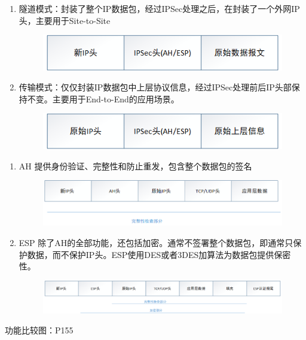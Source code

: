 \begin{enumerate}
	\item 隧道模式：封装了整个IP数据包，经过IPSec处理之后，在封装了一个外网IP头，主要用于Site-to-Site
	\begin{figure}[H]
		\centering
		\includegraphics[width=0.7\linewidth]{figures/screenshot002}
		\caption{}
		\label{fig:screenshot002}
	\end{figure}
	
	\item 传输模式：仅仅封装IP数据包中上层协议信息，经过IPSec处理前后IP头部保持不变。主要用于End-to-End的应用场景。
	\begin{figure}
		\centering
		\includegraphics[width=0.7\linewidth]{figures/screenshot003}
		\caption{}
		\label{fig:screenshot003}
	\end{figure}
	
\end{enumerate}


\begin{enumerate}
	\item AH 提供身份验证、完整性和防止重发，包含整个数据包的签名
	\begin{figure}[H]
		\centering
		\includegraphics[width=0.7\linewidth]{figures/screenshot004}
		\caption{}
		\label{fig:screenshot004}
	\end{figure}
	\item ESP 除了AH的全部功能，还包括加密。通常不签署整个数据包，即通常只保护数据，而不保护IP头。ESP使用DES或者3DES加算法为数据包提供保密性。
	\begin{figure}[H]
		\centering
		\includegraphics[width=0.8\linewidth]{figures/screenshot005}
		\caption{}
		\label{fig:screenshot005}
	\end{figure}
\end{enumerate}
 功能比较图：P155
 
